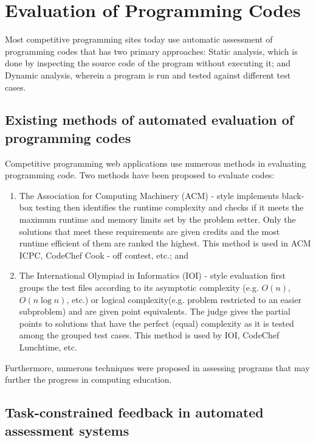 \section{Evaluation of Programming Codes}

Most competitive programming sites today use automatic 
assessment of programming codes that has two primary 
approaches\cite{gupta2017assessment}: Static analysis, which 
is done by inspecting the source code of the program without 
executing it; and Dynamic analysis, wherein a program is run and tested against different test cases.

\subsection{Existing methods of automated evaluation of programming codes}

Competitive programming web applications use numerous methods\cite{gupta2017assessment}\cite{nemeth2018grading} 
in evaluating programming code. Two methods have been proposed\cite{nemeth2018grading} to evaluate codes: 
\begin{enumerate}
    \item The Association for Computing Machinery (ACM) - style implements black-box testing then 
    identifies the runtime complexity and checks if it meets the maximum runtime and memory limits 
    set by the problem setter. Only the solutions that meet these requirements are given credits and the 
    most runtime efficient of them are ranked the highest. This method is used in ACM ICPC, CodeChef Cook - off contest, etc.; and 
    \item The International Olympiad in Informatics (IOI) - style evaluation first groups the test files
     according to its asymptotic complexity (e.g. $O(n)$, $O(n\log{}n)$, etc.) or logical 
     complexity(e.g. problem restricted to an easier subproblem) and are given point equivalents. 
     The judge gives the partial points to solutions that have the perfect (equal) complexity as 
     it is tested among the grouped test cases. This method is used by IOI, CodeChef Lunchtime, etc.
\end{enumerate}

Furthermore, numerous techniques\cite{haldeman2021csf}\cite{watanobe2020next}\cite{lu2018modeling}\cite{yoshizawa2019logic} were proposed in assessing programs that may further the progress in computing education.

\subsection{Task-constrained feedback in automated assessment systems}


